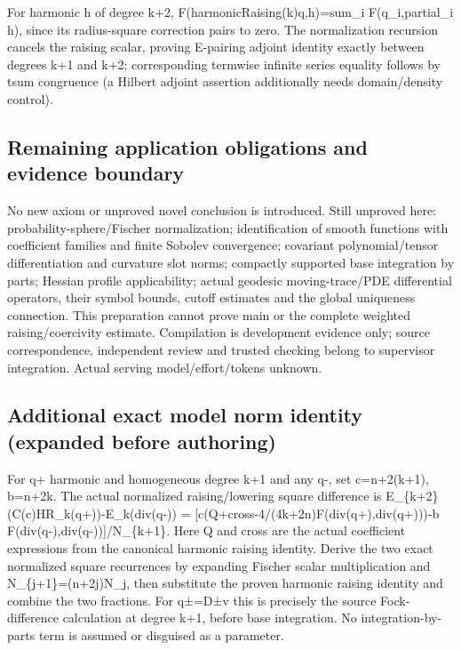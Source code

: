 \documentclass[11pt]{article}
\theoremstyle{definition}
\theoremstyle{remark}
\numberwithin{equation}{section}
\begin{document}
For harmonic h of degree k+2, F(harmonicRaising(k)q,h)=sum\_i
F(q\_i,partial\_i h), since its radius-square correction pairs to zero.
The normalization recursion cancels the raising scalar, proving
E-pairing adjoint identity exactly between degrees k+1 and k+2;
corresponding termwise infinite series equality follows by tsum
congruence (a Hilbert adjoint assertion additionally needs
domain/density control).

\hypertarget{source-e4785d68ade7-remaining-application-obligations-and-evidence-boundary}{%
\subsection{Remaining application obligations and evidence
boundary}\label{source-e4785d68ade7-remaining-application-obligations-and-evidence-boundary}}

No new axiom or unproved novel conclusion is introduced. Still unproved
here: probability-sphere/Fischer normalization; identification of smooth
functions with coefficient families and finite Sobolev convergence;
covariant polynomial/tensor differentiation and curvature slot norms;
compactly supported base integration by parts; Hessian profile
applicability; actual geodesic moving-trace/PDE differential operators,
their symbol bounds, cutoff estimates and the global uniqueness
connection. This preparation cannot prove main or the complete weighted
raising/coercivity estimate. Compilation is development evidence only;
source correspondence, independent review and trusted checking belong to
supervisor integration. Actual serving model/effort/tokens unknown.

\hypertarget{source-e4785d68ade7-additional-exact-model-norm-identity-expanded-before-authoring}{%
\subsection{Additional exact model norm identity (expanded before
authoring)}\label{source-e4785d68ade7-additional-exact-model-norm-identity-expanded-before-authoring}}

For q+ harmonic and homogeneous degree k+1 and any q-, set c=n+2(k+1),
b=n+2k. The actual normalized raising/lowering square difference is
E\_\{k+2\}(C(c)HR\_k(q+))-E\_k(div(q-)) =
{[}c(Q+cross-4/(4k+2n)F(div(q+),div(q+)))-b
F(div(q-),div(q-)){]}/N\_\{k+1\}. Here Q and cross are the actual
coefficient expressions from the canonical harmonic raising identity.
Derive the two exact normalized square recurrences by expanding Fischer
scalar multiplication and N\_\{j+1\}=(n+2j)N\_j, then substitute the
proven harmonic raising identity and combine the two fractions. For
q±=D±v this is precisely the source Fock-difference calculation at
degree k+1, before base integration. No integration-by-parts term is
assumed or disguised as a parameter.
\end{document}
